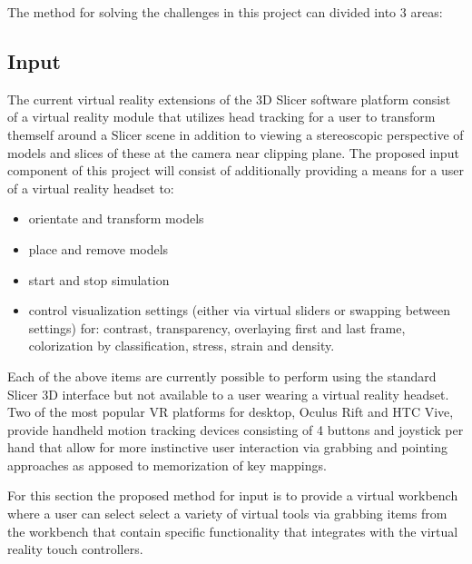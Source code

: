 \begin{comment}
Compiler Suite
* CMake
* Visual Studio 15 2017 Win64
* CMake 3.17.0-rc2
* Qt 5.13.0
\end{comment}


The method for solving the challenges in this project can divided into 3 areas:

\subsection{Input}
The current virtual reality extensions of the 3D Slicer software platform consist of a virtual reality module that utilizes head tracking for a user to transform themself around a Slicer scene in addition to viewing a stereoscopic perspective of models and slices of these at the camera near clipping plane. The proposed input component of this project will consist of additionally providing a means for a user of a virtual reality headset to:

\begin{itemize}
  \item orientate and transform models
  \item place and remove models
  \item start and stop simulation
  \item control visualization settings (either via virtual sliders or swapping between settings) for: contrast, transparency, overlaying first and last frame, colorization by classification, stress, strain and density.
\end{itemize}

Each of the above items are currently possible to perform using the standard Slicer 3D interface but not available to a user wearing a virtual reality headset. Two of the most popular VR platforms for desktop, Oculus Rift and HTC Vive, provide handheld motion tracking devices consisting of 4 buttons and joystick per hand that allow for more instinctive user interaction via grabbing and pointing approaches as apposed to memorization of key mappings.

For this section the proposed method for input is to provide a virtual workbench where a user can select select a variety of virtual tools via grabbing items from the workbench that contain specific functionality that integrates with the virtual reality touch controllers.

